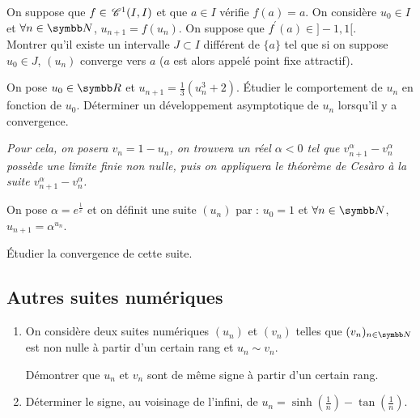 \begin{exercice}
    On suppose que $f\in \,\mathscr C^{1}(I,I)$ et que $a\in I$ vérifie $f(a)=a$.
    On considère $u_{0}\in I$ et $\forall n\in\N$, $u_{n+1}=f(u_{n})$.
    On suppose que $f^{\prime}(a)\in]-1,1[$. \\

    Montrer qu'il existe un intervalle $J\subset I$ différent de $\{a\}$ tel que si on suppose $u_{0}\in J$,
    $(u_n)$ converge vers $a$ ($a$ est alors appelé point fixe attractif).
\end{exercice}

\begin{exercice}
    On pose $u_{0}\in\R$ et $u_{n+1}=\frac{1}{3}(u_{n}^{3}+2)$.
    Étudier le comportement de $u_{n}$ en fonction de $u_{0}$.
    Déterminer un développement asymptotique de $u_{n}$ lorsqu'il y a convergence.

    \textit{Pour cela, on posera $v_{n}=1-u_{n}$, on trouvera un réel $\alpha<0$ tel que $v_{n+1}^{\alpha}-v_{n}^{\alpha}$ possède une limite finie non nulle, 
    puis on appliquera le théorème de Cesàro à la suite $v_{n+1}^{\alpha}-v_{n}^{\alpha}$.}
\end{exercice}

\begin{exercice}
    On pose $\alpha=e^{\frac 1 e}$ et on définit une suite $(u_{n})$ par :
    $u_{0}=1$ et $\forall n\in\N$, $u_{n+1}=\alpha^{u_{n}}$.

    Étudier la convergence de cette suite.
\end{exercice}

\newpage
\subsection{Autres suites numériques}

\begin{exercice}
\begin{enumerate}
    \item On considère deux suites numériques $(u_{n})$ et $(v_{n})$ 
        telles que $(v_{n})_{n\in\N}$ est non nulle à partir d'un certain rang et $u_{n}\sim v_{n}$.
        
        Démontrer que $u_{n}$ et $v_{n}$ sont de même signe à partir d'un certain rang.

    \item Déterminer le signe, au voisinage de l'infini, de $u_{n}=\sinh\left(\frac{1}{n}\right)-\tan\left(\frac{1}{n}\right)$.
\end{enumerate}
\end{exercice}

